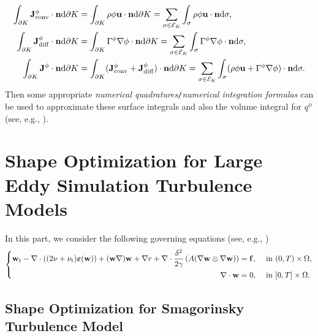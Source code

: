 \documentclass[oneside,11pt]{book}
\numberwithin{equation}{section}
\begin{document}
\begin{align*}
    \int_{\partial K} {\bf J}_{\rm conv}^\phi\cdot{\bf n}{\rm d}\partial K &= \int_{\partial K} \rho\phi{\bf u}\cdot{\bf n}{\rm d}\partial K = \sum_{\sigma\in\mathcal{E}_K} \int_\sigma \rho\phi{\bf u}\cdot{\bf n}{\rm d}\sigma,\\
    \int_{\partial K} {\bf J}_{\rm diff}^\phi\cdot{\bf n}{\rm d}\partial K &= \int_{\partial K} \Gamma^\phi\nabla\phi\cdot{\bf n}{\rm d}\partial K = \sum_{\sigma\in\mathcal{E}_K} \int_\sigma \Gamma^\phi\nabla\phi\cdot{\bf n}{\rm d}\sigma,\\
    \int_{\partial K} {\bf J}^\phi\cdot{\bf n}{\rm d}\partial K &= \int_{\partial K} ({\bf J}_{\rm conv}^\phi + {\bf J}_{\rm diff}^\phi)\cdot{\bf n}{\rm d}\partial K = \sum_{\sigma\in\mathcal{E}_K} \int_\sigma (\rho\phi{\bf u} + \Gamma^\phi\nabla\phi)\cdot{\bf n}{\rm d}\sigma.
\end{align*}
Then some appropriate \textit{numerical quadratures}\texttt{/}\textit{numerical integration formulas} can be used to approximate these surface integrals and also the volume integral for $q^\phi$ (see, e.g., \cite[Chap. 7]{Isaacson_Keller1994}).


\part{Shape Optimization for Large Eddy Simulation Turbulence Models}

In this part, we consider the following governing equations (see, e.g., \cite{John2004})
\begin{equation}
    \label{general LES}
    \left\{\begin{split}
        {\bf w}_t - \nabla\cdot((2\nu + \nu_{\rm t})\boldsymbol{\varepsilon}({\bf w})) + ({\bf w}\nabla){\bf w} + \nabla r + \nabla\cdot\frac{\delta^2}{2\gamma}\left(A(\nabla{\bf w}\otimes\nabla{\bf w})\right) &= {\bf f},&&\mbox{ in }(0,T)\times\Omega,\\
        \nabla\cdot{\bf w} &= 0,&&\mbox{ in }[0,T]\times\Omega.
    \end{split}\right.
\end{equation}

\chapter{Shape Optimization for Smagorinsky Turbulence Model}
\end{document}
